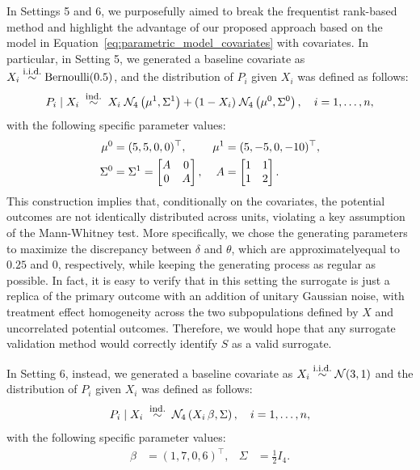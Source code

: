 \documentclass[12pt]{article}
\newcommand{\iid}{\overset{\text{\footnotesize i.i.d.}}{\sim}}
\begin{document}
In Settings 5 and 6, we purposefully aimed to break the frequentist rank-based method and highlight the advantage of our proposed approach based on the model in Equation~\eqref{eq:parametric_model_covariates} with covariates. In particular, in Setting 5, we generated a baseline covariate as  \(X_{i} \iid \text{Bernoulli}(0.5)\), and the distribution of \(P_{i}\) given \(X_{i}\) was defined as follows:
\begin{equation}
  P_{i} \mid X_{i} \; \overset{\text{\footnotesize ind.}}{\sim} \; X_{i} \; \mathcal{N}_{4} \left(\mu^{1}, \Sigma^{1}\right)
  + (1 - X_{i}) \; \mathcal{N}_{4}\left(\mu^{0}, \Sigma^{0}\right), 
  \quad i = 1,\ldots,n,
\end{equation}
with the following specific parameter values:
\begin{align}
    \mu^{0} &= (5, 5, 0, 0)^\top, &
    \mu^{1} &= (5, -5, 0, -10)^\top, \notag\\
    \Sigma^{0} &= \Sigma^{1} = 
    \begin{bmatrix}
      A & 0 \\
      0 & A
    \end{bmatrix}, &
    A &= \begin{bmatrix} 1 & 1 \\ 1 & 2 \end{bmatrix}.
\end{align}
This construction implies that, conditionally on the covariates, the potential outcomes are not identically distributed across units, violating a key assumption of the Mann-Whitney test. More specifically, we chose the generating parameters to maximize the discrepancy between \(\delta\) and \(\theta\), which are approximatelyequal to \(0.25\) and \(0\), respectively, while keeping the generating process as regular as possible. In fact, it is easy to verify that in this setting the surrogate is just a replica of the primary outcome with an addition of unitary Gaussian noise, with treatment effect homogeneity across the two subpopulations defined by \(X\) and uncorrelated potential outcomes. Therefore, we would hope that any surrogate validation method would correctly identify $S$ as a valid surrogate.

In Setting 6, instead, we generated a baseline covariate as  \(X_{i} \iid \mathcal{N} (3, 1)\) and the distribution of \(P_{i}\) given \(X_{i}\) was defined as follows:
\begin{equation}
  P_{i} \mid X_{i} \; \overset{\text{\footnotesize ind.}}{\sim} \; \mathcal{N}_{4} \left(X_{i} \, \beta, \Sigma\right), 
  \quad i = 1,\ldots,n,
\end{equation}
with the following specific parameter values:
\begin{align}
    \beta &= ( 1, 7, 0, 6 )^\top, &
    \Sigma &= \frac{1}{2} I_{4}.
\end{align}      
\end{document}
